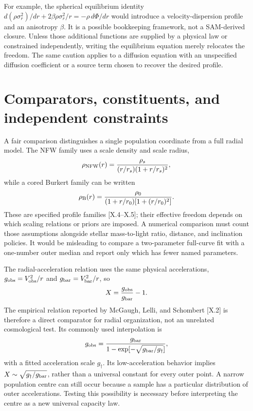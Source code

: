 For example, the spherical equilibrium identity $d(\rho\sigma_r^2)/dr+2\beta\rho\sigma_r^2/r=-\rho\,d\Phi/dr$ would introduce a velocity-dispersion profile and an anisotropy $\beta$. It is a possible bookkeeping framework, not a SAM-derived closure. Unless those additional functions are supplied by a physical law or constrained independently, writing the equilibrium equation merely relocates the freedom. The same caution applies to a diffusion equation with an unspecified diffusion coefficient or a source term chosen to recover the desired profile.

\section{Comparators, constituents, and independent constraints}

A fair comparison distinguishes a single population coordinate from a full radial model. The NFW family uses a scale density and scale radius,
\begin{equation}
 \rho_{\rm NFW}(r)=\frac{\rho_s}{(r/r_s)(1+r/r_s)^2},
 \label{c10:nfw}
\end{equation}
while a cored Burkert family can be written
\begin{equation}
 \rho_{\rm B}(r)=\frac{\rho_0}{(1+r/r_0)[1+(r/r_0)^2]}.
 \label{c10:burkert}
\end{equation}
These are specified profile families [X.4--X.5]; their effective freedom depends on which scaling relations or priors are imposed. A numerical comparison must count those assumptions alongside stellar mass-to-light ratio, distance, and inclination policies. It would be misleading to compare a two-parameter full-curve fit with a one-number outer median and report only which has fewer named parameters.

The radial-acceleration relation uses the same physical accelerations, $g_{\rm obs}=V_{\rm obs}^2/r$ and $g_{\rm bar}=V_{\rm bar}^2/r$, so
\begin{equation}
 X=\frac{g_{\rm obs}}{g_{\rm bar}}-1.
 \label{c10:raridentity}
\end{equation}
The empirical relation reported by McGaugh, Lelli, and Schombert [X.2] is therefore a direct comparator for radial organization, not an unrelated cosmological test. Its commonly used interpolation is
\begin{equation}
 g_{\rm obs}=\frac{g_{\rm bar}}
 {1-\exp[-\sqrt{g_{\rm bar}/g_\dagger}]},
 \label{c10:rar}
\end{equation}
with a fitted acceleration scale $g_\dagger$. Its low-acceleration behavior implies $X\sim\sqrt{g_\dagger/g_{\rm bar}}$, rather than a universal constant for every outer point. A narrow population centre can still occur because a sample has a particular distribution of outer accelerations. Testing this possibility is necessary before interpreting the centre as a new universal capacity law.

